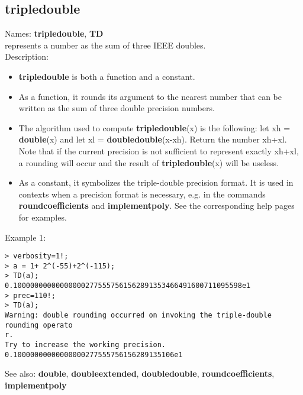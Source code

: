 \subsection{ tripledouble }
\noindent Names: \textbf{tripledouble}, \textbf{TD}\\
represents a number as the sum of three IEEE doubles.\\

\noindent Description: \begin{itemize}

\item \textbf{tripledouble} is both a function and a constant.

\item As a function, it rounds its argument to the nearest number that can be written
   as the sum of three double precision numbers.

\item The algorithm used to compute \textbf{tripledouble}(x) is the following: let xh = \textbf{double}(x)
   and let xl = \textbf{doubledouble}(x-xh). Return the number xh+xl. Note that if the
   current precision is not sufficient to represent exactly xh+xl, a rounding will
   occur and the result of \textbf{tripledouble}(x) will be useless.

\item As a constant, it symbolizes the triple-double precision format. It is used in 
   contexts when a precision format is necessary, e.g. in the commands 
   \textbf{roundcoefficients} and \textbf{implementpoly}.
   See the corresponding help pages for examples.
\end{itemize}
\noindent Example 1: 
\begin{center}\begin{minipage}{15cm}\begin{Verbatim}[frame=single]
> verbosity=1!;
> a = 1+ 2^(-55)+2^(-115);
> TD(a);
0.100000000000000002775557561562891353466491600711095598e1
> prec=110!;
> TD(a);
Warning: double rounding occurred on invoking the triple-double rounding operato
r.
Try to increase the working precision.
0.10000000000000000277555756156289135106e1
\end{Verbatim}
\end{minipage}\end{center}
See also: \textbf{double}, \textbf{doubleextended}, \textbf{doubledouble}, \textbf{roundcoefficients}, \textbf{implementpoly}
